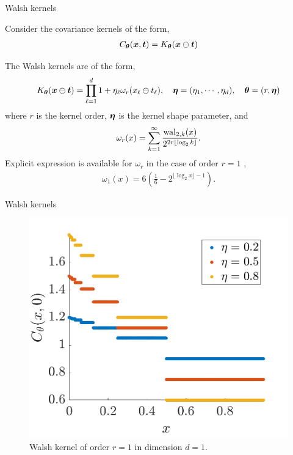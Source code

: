 \documentclass[handout, 10pt,compress,xcolor={usenames,dvipsnames}]{beamer} %
\newcommand{\bm}[1]{\boldsymbol{#1}}
\renewcommand{\vtheta}{{\bm{\theta}}}
\begin{document}
\begin{frame}{Walsh kernels}

Consider the covariance kernels of the form,
\begin{align}
\label{eqn:digital_shift_in_kernel}
C_{\vtheta}(\vx, \vt) = K_{\vtheta} (\vx \ominus \vt) 
\end{align}

The Walsh kernels are of the form,
\begin{align}
\label{eqn:walsh_kernel}
K_{\vtheta} (\vx \ominus \vt) =  
\prod_{\ell=1}^d  1 + \eta_\ell \omega_{r} (x_\ell \ominus t_\ell), \quad \veta = (\eta_1, \cdots, \eta_d), \quad \vtheta = (r, \veta)
\end{align}
where $r$ is the kernel order, $\boldsymbol{\eta}$ is the kernel shape parameter, and
\begin{align*}
\omega_r(x) = \sum_{k=1}^\infty 
\frac{\textup{wal}_{2,k}(x) }{2^{2r \lfloor \log_2 k \rfloor}}.
\end{align*}
Explicit expression is available for $\omega_{r}$ in the case of order $r=1$ \cite{Nuyens2013}, %
\begin{align}
\label{eqn:omega1}
\omega_1(x) 
= 6\left( \frac 16 - 2^{\lfloor \log_2 x \rfloor -1 }\right).
\end{align}
\end{frame}


\begin{frame}{Walsh kernels}
	\vspace{-6ex}
\begin{figure}
	\centering
	\includegraphics[width=0.7\linewidth]{"../figures/walsh_kernel dim_1"}
	\caption[Walsh kernel]{Walsh kernel of order $r=1$ in dimension $d=1$. } 
	\label{fig:walshkernel-dim1}
\end{figure}
\end{frame}
\end{document}
